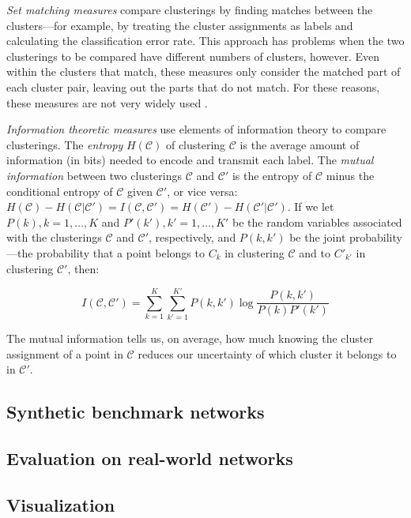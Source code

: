 \emph{Set matching measures} compare clusterings by finding matches
between the clusters---for example, by treating the cluster assignments
as labels and calculating the classification error rate. This approach
has problems when the two clusterings to be compared have different
numbers of clusters, however. Even within the clusters that match, these
measures only consider the matched part of each cluster pair, leaving
out the parts that do not match. For these reasons, these measures are
not very widely used
\autocites{meila_comparing_2007}{vinh_information_2010}.

\emph{Information theoretic measures} use elements of information theory
to compare clusterings. The \emph{entropy} \(H(\mathcal{C})\) of
clustering \(\mathcal{C}\) is the average amount of information (in
bits) needed to encode and transmit each label. The \emph{mutual
information} between two clusterings \(\mathcal{C}\) and
\(\mathcal{C'}\) is the entropy of \(\mathcal{C}\) minus the conditional
entropy of \(\mathcal{C}\) given \(\mathcal{C'}\), or vice versa:
\(H(\mathcal{C}) - H(\mathcal{C}|\mathcal{C'}) = I(\mathcal{C}, \mathcal{C'}) = H(\mathcal{C'}) - H(\mathcal{C'}|\mathcal{C'})\).
If we let \(P(k), k = 1, \ldots, K\) and \(P'(k'), k' = 1, \ldots, K'\)
be the random variables associated with the clusterings \(\mathcal{C}\)
and \(\mathcal{C'}\), respectively, and \(P(k, k')\) be the joint
probability---the probability that a point belongs to \(C_k\) in
clustering \(\mathcal{C}\) and to \(C'_{k'}\) in clustering
\(\mathcal{C'}\), then:

\[I(\mathcal{C}, \mathcal{C'}) = \sum_{k=1}^{K} \sum_{k'=1}^{K'} P(k, k') \log \frac{P(k, k')}{P(k) P'(k')}\]

The mutual information tells us, on average, how much knowing the
cluster assignment of a point in \(\mathcal{C}\) reduces our uncertainty
of which cluster it belongs to in \(\mathcal{C'}\).

\subsection{Synthetic benchmark
networks}\label{synthetic-benchmark-networks}

\subsection{Evaluation on real-world
networks}\label{evaluation-on-real-world-networks}

\subsection{Visualization}\label{visualization}
